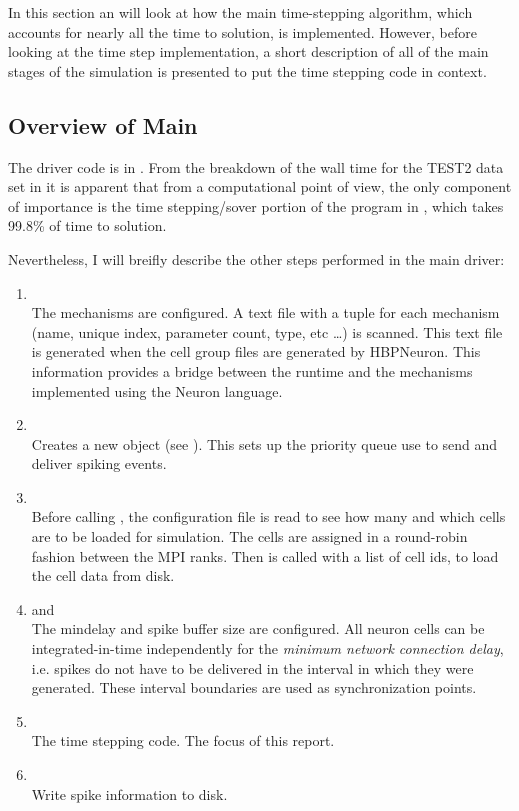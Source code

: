 In this section an will look at how the main time-stepping algorithm, which accounts for nearly all the time to solution, is implemented. However, before looking at the time step implementation, a short description of all of the main stages of the simulation is presented to put the time stepping code in context.
\subsection{Overview of Main}
The driver code is in . From the breakdown of the wall time for the TEST2 data set in  it is apparent that from a computational point of view, the only component of importance is the time stepping/sover portion of the program in , which takes 99.8\% of time to solution.

Nevertheless, I will breifly describe the other steps performed in the main driver:
\begin{enumerate}
\item {}\\
The mechanisms are configured. A text file with a tuple for each mechanism (name, unique index, parameter count, type,  etc \dots) is scanned. This text file is generated when the cell group files are generated by HBPNeuron. This information provides a bridge between the runtime and the mechanisms implemented using the Neuron \hoc language.
\item {}\\
    Creates a new  object (see ). This sets up the priority queue use to send and deliver spiking events.
\item {}\\
    Before calling , the configuration file  is read to see how many and which cells are to be loaded for simulation. The cells are assigned in a round-robin fashion between the MPI ranks. Then  is called with a list of cell ids, to load the cell data from disk.
\item {} and \\
    The mindelay and spike buffer size are configured. All neuron cells can be integrated-in-time independently for the \emph{minimum network connection delay}, i.e. spikes do not have to be delivered in the interval in which they were generated. These interval boundaries are used as synchronization points.
\item {} \\
    The time stepping code. The focus of this report.
\item {} \\
    Write spike information to disk.
\end{enumerate}

